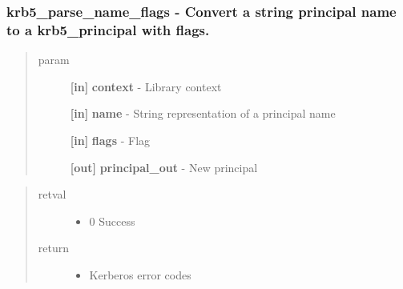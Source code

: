 \documentclass[letterpaper,10pt,english]{sphinxmanual}
\begin{document}
\subsubsection{krb5\_parse\_name\_flags -  Convert a string principal name to a krb5\_principal with flags.}
\label{appdev/refs/api/krb5_parse_name_flags:krb5-parse-name-flags-convert-a-string-principal-name-to-a-krb5-principal-with-flags}\label{appdev/refs/api/krb5_parse_name_flags::doc}

\begin{fulllineitems}
\label{appdev/refs/api/krb5_parse_name_flags:krb5_parse_name_flags}
\end{fulllineitems}

\begin{quote}\begin{description}
\item[{param}] \leavevmode
\textbf{{[}in{]}} \textbf{context} - Library context

\textbf{{[}in{]}} \textbf{name} - String representation of a principal name

\textbf{{[}in{]}} \textbf{flags} - Flag

\textbf{{[}out{]}} \textbf{principal\_out} - New principal

\end{description}\end{quote}
\begin{quote}\begin{description}
\item[{retval}] \leavevmode\begin{itemize}
\item {} 
0   Success

\end{itemize}

\item[{return}] \leavevmode\begin{itemize}
\item {} 
Kerberos error codes

\end{itemize}

\end{description}\end{quote}
\end{document}
